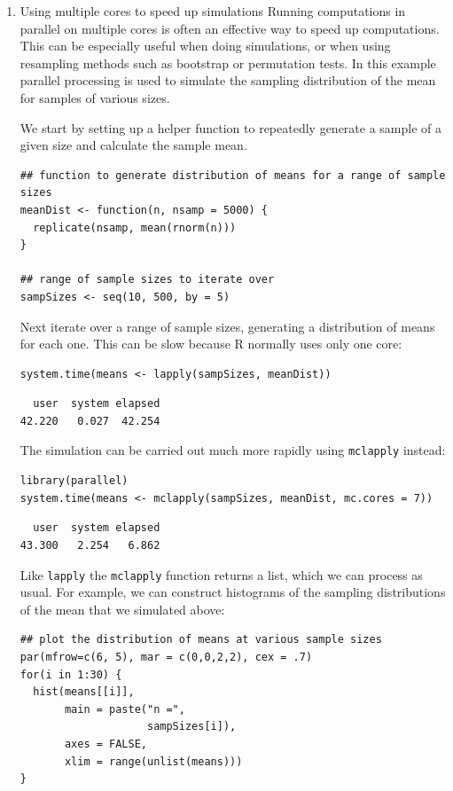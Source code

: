 \documentclass[11pt]{article}
\begin{document}
\begin{enumerate}
\item Using multiple cores to speed up simulations
\label{sec:org81b679a}
Running computations in parallel on multiple cores is often an effective way to speed up computations. This can be especially useful when doing simulations, or when using resampling methods such as bootstrap or permutation tests. In this example parallel processing is used to simulate the sampling distribution of the mean for samples of various sizes.

We start by setting up a helper function to repeatedly generate a sample of a given size and calculate the sample mean.
\begin{verbatim}
## function to generate distribution of means for a range of sample sizes
meanDist <- function(n, nsamp = 5000) {
  replicate(nsamp, mean(rnorm(n)))
}

## range of sample sizes to iterate over
sampSizes <- seq(10, 500, by = 5)

\end{verbatim}

Next iterate over a range of sample sizes, generating a distribution of means for each one. This can be slow because R normally uses only one core:
\begin{verbatim}
system.time(means <- lapply(sampSizes, meanDist))
\end{verbatim}

\begin{verbatim}
  user  system elapsed 
42.220   0.027  42.254
\end{verbatim}

The simulation can be carried out much more rapidly using \texttt{mclapply} instead:
\begin{verbatim}
library(parallel) 
system.time(means <- mclapply(sampSizes, meanDist, mc.cores = 7))
\end{verbatim}

\begin{verbatim}
  user  system elapsed 
43.300   2.254   6.862
\end{verbatim}

Like \texttt{lapply} the \texttt{mclapply} function returns a list, which we can process as usual. For example, we can construct histograms of the sampling distributions of the mean that we simulated above:
\begin{verbatim}
## plot the distribution of means at various sample sizes
par(mfrow=c(6, 5), mar = c(0,0,2,2), cex = .7)
for(i in 1:30) {
  hist(means[[i]], 
       main = paste("n =", 
                    sampSizes[i]), 
       axes = FALSE,
       xlim = range(unlist(means)))
}
\end{verbatim}


\end{enumerate}
\end{document}
